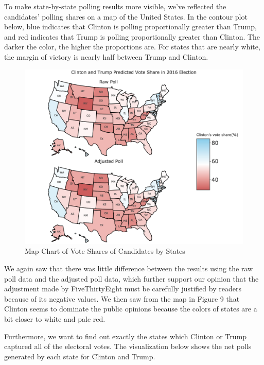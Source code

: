 \documentclass[
  12pt,
]{article}
\begin{document}
To make state-by-state polling results more visible, we've reflected the
candidates' polling shares on a map of the United States. In the contour
plot below, blue indicates that Clinton is polling proportionally
greater than Trump, and red indicates that Trump is polling
proportionally greater than Clinton. The darker the color, the higher
the proportions are. For states that are nearly white, the margin of
victory is nearly half between Trump and Clinton.

\begin{figure}
\centering
\includegraphics{./Figures/mapchart_1_2.png}
\caption{Map Chart of Vote Shares of Candidates by States}
\end{figure}

We again saw that there was little difference between the results using
the raw poll data and the adjusted poll data, which further support our
opinion that the adjustment made by FiveThirtyEight must be carefully
justified by readers because of its negative values. We then saw from
the map in Figure 9 that Clinton seems to dominate the public opinions
because the colors of states are a bit closer to white and pale red.

Furthermore, we want to find out exactly the states which Clinton or
Trump captured all of the electoral votes. The visualization below shows
the net polls generated by each state for Clinton and Trump.
\end{document}
